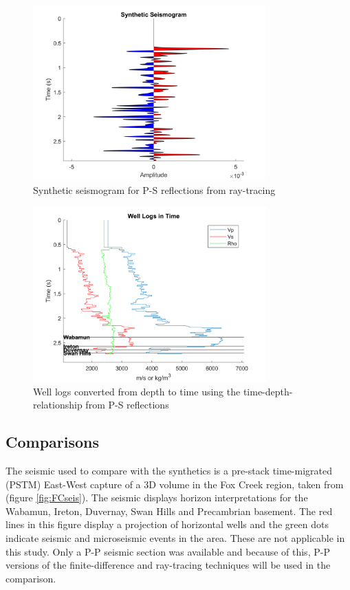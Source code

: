 \documentclass[12pt]{article}
\begin{document}
\begin{figure}[!htb]
	\centering
	\includegraphics[width=0.8\textwidth]{Figures/RTCsynthetic.png}
	\caption[Fox Creek ray-tracing P-S synthetic seismogram]{Synthetic seismogram for P-S reflections from ray-tracing}
	\label{fig:RTCsynthetic}
\end{figure}	

\begin{figure}[!htb]
	\centering
	\includegraphics[width=0.8\textwidth]{Figures/RTCtimelogs.png}
	\caption[Fox Creek ray-tracing P-S well logs in time]{Well logs converted from depth to time using the time-depth-relationship from P-S reflections}
	\label{fig:RTCtimelogs}
\end{figure}
\FloatBarrier	

\subsection{Comparisons}

	The seismic used to compare with the synthetics is a pre-stack time-migrated (PSTM) East-West capture of a 3D volume in the Fox Creek region, taken from \cite{german2018} (figure \ref{fig:FCseis}). The seismic displays horizon interpretations for the Wabamun, Ireton, Duvernay, Swan Hills and Precambrian basement. The red lines in this figure display a projection of horizontal wells and the green dots indicate seismic and microseismic events in the area. These are not applicable in this study. Only a P-P seismic section was available and because of this, P-P versions of the finite-difference and ray-tracing techniques will be used in the comparison.
	
\end{document}
